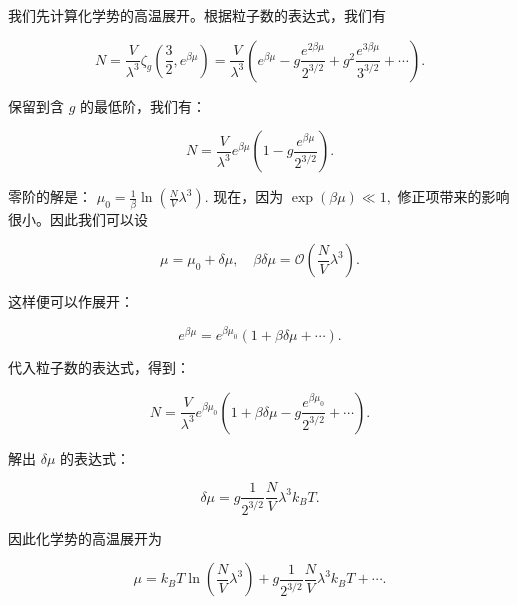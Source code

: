 我们先计算化学势的高温展开。根据粒子数的表达式，我们有
\begin{linenomath}\begin{equation}
    N = \frac{V}{\lambda^3} \zeta_g\left( \frac{3}{2}, e^{\beta\mu} \right) = \frac{V}{\lambda^3} \left( e^{\beta\mu} - g \frac{e^{2\beta\mu}}{2^{3/2}} + g^2 \frac{e^{3\beta\mu}}{3^{3/2}} + \cdots \right).
\end{equation}\end{linenomath}
保留到含 $g$ 的最低阶，我们有：
\begin{linenomath}
    \begin{equation}
        N = \frac{V}{\lambda^3} e^{\beta\mu} \left( 1 - g \frac{e^{\beta\mu}}{2^{3/2}} \right).
    \end{equation}
\end{linenomath}
零阶的解是： $\mu_0 = \frac{1}{\beta} \ln \left( \frac{N}{V} \lambda^3 \right).$ 现在，因为 $\exp(\beta\mu) \ll 1,$ 修正项带来的影响很小。因此我们可以设
\begin{linenomath}
    \begin{equation}
        \mu = \mu_0 + \delta \mu, \quad \beta\delta \mu = \mathcal{O}\left( \frac{N}{V} \lambda^3 \right).
    \end{equation}
\end{linenomath}
这样便可以作展开：
\begin{linenomath}\begin{equation}
    e^{\beta\mu} = e^{\beta\mu_0} \left( 1 + \beta \delta \mu + \cdots \right).
\end{equation}\end{linenomath}
代入粒子数的表达式，得到：
\begin{linenomath}\begin{equation}
    N = \frac{V}{\lambda^3} e^{\beta\mu_0} \left( 1 + \beta \delta \mu - g \frac{e^{\beta\mu_0}}{2^{3/2}} + \cdots \right).
\end{equation}\end{linenomath}
解出 $\delta \mu$ 的表达式：
\begin{linenomath}\begin{equation}
    \delta \mu = g \frac{1}{2^{3/2}} \frac{N}{V} \lambda^3 k_B T.
\end{equation}\end{linenomath}
因此化学势的高温展开为
\begin{linenomath}\begin{equation}
    \mu = k_B T \ln \left( \frac{N}{V} \lambda^3 \right) + g \frac{1}{2^{3/2}} \frac{N}{V} \lambda^3 k_B T + \cdots.
\end{equation}\end{linenomath}

